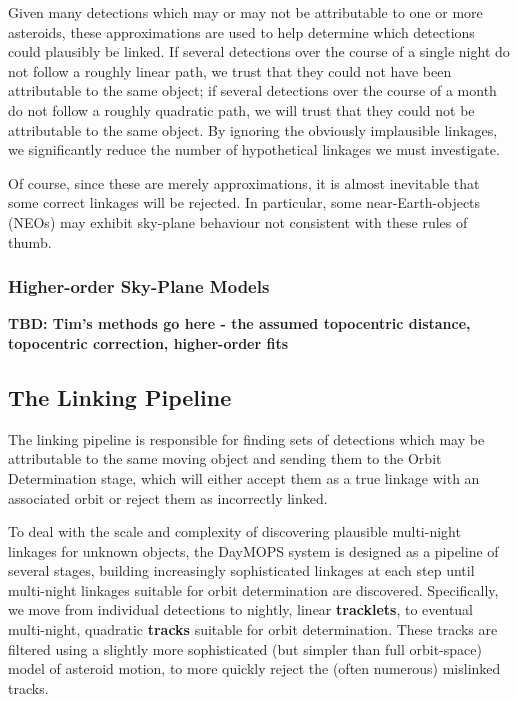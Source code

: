 Given many detections which may or may not be attributable to one or
more asteroids, these approximations are used to help determine which
detections could plausibly be linked.  If several detections over the
course of a single night do not follow a roughly linear path, we trust
that they could not have been attributable to the same object; if
several detections over the course of a month do not follow a roughly
quadratic path, we will trust that they could not be attributable to
the same object.  By ignoring the obviously implausible linkages, we
significantly reduce the number of hypothetical linkages we must
investigate.

Of course, since these are merely approximations, it is almost
inevitable that some correct linkages will be rejected.  In
particular, some near-Earth-objects (NEOs) may exhibit sky-plane
behaviour not consistent with these rules of thumb.


\subsubsection{Higher-order Sky-Plane Models}
\textbf{TBD: Tim's methods go here - the assumed topocentric distance, topocentric correction, higher-order fits}


\subsection{The Linking Pipeline}
The linking pipeline is responsible for finding sets of detections
which may be attributable to the same moving object and sending them
to the Orbit Determination stage, which will either accept them as a
true linkage with an associated orbit or reject them as incorrectly
linked.  

To deal with the scale and complexity of discovering plausible
multi-night linkages for unknown objects, the DayMOPS system is
designed as a pipeline of several stages, building increasingly
sophisticated linkages at each step until multi-night linkages
suitable for orbit determination are discovered.  Specifically, we
move from individual detections to nightly, linear \textbf{tracklets},
to eventual multi-night, quadratic \textbf{tracks} suitable for orbit
determination.  These tracks are filtered using a slightly more
sophisticated (but simpler than full orbit-space) model of asteroid
motion, to more quickly reject the (often numerous) mislinked tracks.


